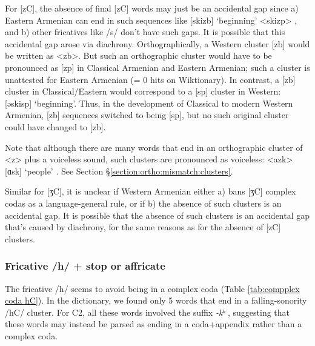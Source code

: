 	
	
	For [zC], the absence of final [zC] words may just be an accidental gap since a) Eastern Armenian can end in such sequences like [skizb] `beginning' <skizp> , and b) other fricatives like /s/ don't have such gaps. It is possible that this accidental gap arose via diachrony. Orthographically, a Western cluster [zb] would be written as  <zb>. But such an orthographic cluster would have to be pronounced as [zp] in Classical Armenian and Eastern Armenian; such a cluster is unattested for Eastern Armenian (= 0 hits on Wiktionary). In contrast, a [zb] cluster in Classical/Eastern would correspond to a [sp] cluster in Western: [əskisp] `beginning'. Thus, in the development of Classical to modern Western Armenian, [zb] sequences switched to being [sp], but no such original cluster could have changed to [zb]. 
	
	Note that although there are many words that end in an orthographic cluster of <z> plus a voiceless sound, such clusters are pronounced as voiceless: <azk> [ɑsk] `people' . See Section \S\ref{section:ortho:mismatch:clusters}. 
	
	Similar for [ʒC], it is unclear if Western Armenian either a) bans [ʒC] complex codas as a language-general rule, or if b) the absence of such clusters is an accidental gap. It is possible that the absence of such clusters is an accidental gap that's caused by diachrony, for the same reasons as for the absence of [zC] clusters.  
	
	
	
	
	
	\subsubsection{Fricative /h/ + stop or affricate}\label{section:syllable:Final2C:FallingOther:FricHstop}
	The fricative /h/ seems to avoid being in a complex coda (Table \ref{tab:compplex coda  hC}). In the \citep{kouyoumdjian-1970-DictionaryArmenianEnglish} dictionary, we found only 5 words that end in a falling-sonority /hC/ cluster. For C2, all these words involved the suffix \textit{-kʰ} , suggesting that these words may instead be parsed as ending in a coda+appendix rather than a complex coda. 
	
